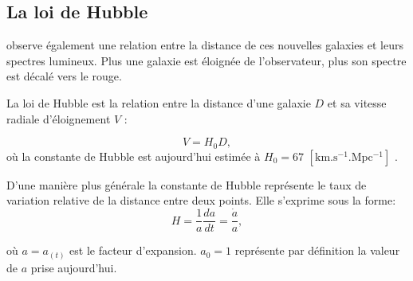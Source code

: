 \subsection{La loi de Hubble}
\cite{1929CoMtW...3...23H} observe également une relation entre la distance de ces nouvelles galaxies et leurs spectres lumineux.
Plus une galaxie est éloignée de l'observateur, plus son spectre est décalé vers le rouge.
%

La loi de Hubble est la relation entre la distance d'une galaxie $D$ et sa vitesse radiale d'éloignement $V$ : %

\begin{equation}
V = H_0 D,
\end{equation}
où la constante de Hubble est aujourd'hui estimée à $H_0 = 67$ $\mathrm{ \left[ km.s^{-1}.Mpc^{-1} \right ] }$ \citep{planck_collaboration_planck_2016}.

D'une manière plus générale la constante de Hubble représente le taux de variation relative de la distance entre deux points.
Elle s'exprime sous la forme:
\begin{equation}
H=\frac{1}{a} \frac{da}{dt} = \frac{\dot{a}}{a},
\end{equation}

où $a = a_{(t)}$ est le facteur d'expansion.
$a_0=1$ représente par définition la valeur de $a$ prise aujourd'hui.

